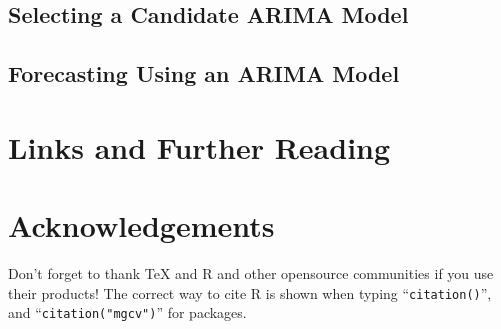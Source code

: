 \documentclass[11pt, a4paper]{article} %
\begin{document}
\subsection{Selecting a Candidate ARIMA Model}%
\subsection{Forecasting Using an ARIMA Model}%

\section{Links and Further Reading}%
\section{Acknowledgements}%
Don't forget to thank TeX and R and other opensource communities if you use their products! The correct way to cite R is shown when typing ``\texttt{citation()}'', and ``\texttt{citation("mgcv")}'' for packages.

\clearpage
\end{document}
